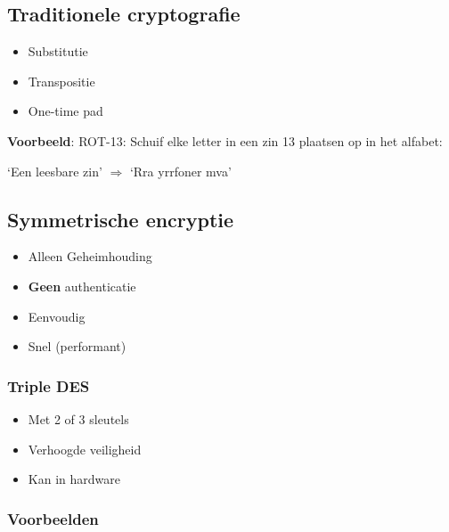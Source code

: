 \documentclass{article}
\newcommand{\bold}[1]{\textbf{#1}}
\begin{document}
\subsection{Traditionele cryptografie}

\begin{itemize}
    \item Substitutie
    \item Transpositie
    \item One-time pad
\end{itemize}

\bold{Voorbeeld}: ROT-13: Schuif elke letter in een zin 13 plaatsen op in het alfabet:

`Een leesbare zin' $\Rightarrow$ `Rra yrrfoner mva'

\subsection{Symmetrische encryptie}

\begin{itemize}
    \item Alleen Geheimhouding
    \item \bold{Geen} authenticatie
    \item Eenvoudig
    \item Snel (performant)
\end{itemize}

\subsubsection{Triple DES}

\begin{itemize}
    \item Met 2 of 3 sleutels
    \item Verhoogde veiligheid
    \item Kan in hardware
\end{itemize}

\subsubsection{Voorbeelden}
\end{document}
